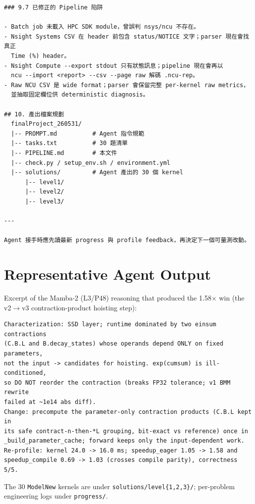 \documentclass[conference]{IEEEtran}
\begin{document}
\begin{lstlisting}
### 9.7 已修正的 Pipeline 陷阱

- Batch job 未載入 HPC SDK module，曾誤判 nsys/ncu 不存在。
- Nsight Systems CSV 在 header 前包含 status/NOTICE 文字；parser 現在會找真正
  Time (%) header。
- Nsight Compute --export stdout 只有狀態訊息；pipeline 現在會再以
  ncu --import <report> --csv --page raw 解碼 .ncu-rep。
- Raw NCU CSV 是 wide format；parser 會保留完整 per-kernel raw metrics，
  並抽取固定欄位供 deterministic diagnosis。

## 10. 產出檔案規劃
  finalProject_260531/
  |-- PROMPT.md          # Agent 指令規範
  |-- tasks.txt          # 30 題清單
  |-- PIPELINE.md        # 本文件
  |-- check.py / setup_env.sh / environment.yml
  |-- solutions/         # Agent 產出的 30 個 kernel
      |-- level1/
      |-- level2/
      |-- level3/

---

Agent 接手時應先讀最新 progress 與 profile feedback，再決定下一個可量測改動。
\end{lstlisting}

\section{Representative Agent Output}
\label{app:output}
Excerpt of the Mamba-2 (L3/P48) reasoning that produced the 1.58$\times$ win
(the v2$\to$v3 contraction-product hoisting step):
\begin{lstlisting}
Characterization: SSD layer; runtime dominated by two einsum contractions
(C.B.L and B.decay_states) whose operands depend ONLY on fixed parameters,
not the input -> candidates for hoisting. exp(cumsum) is ill-conditioned,
so DO NOT reorder the contraction (breaks FP32 tolerance; v1 BMM rewrite
failed at ~1e14 abs diff).
Change: precompute the parameter-only contraction products (C.B.L kept in
its safe contract-n-then-*L grouping, bit-exact vs reference) once in
_build_parameter_cache; forward keeps only the input-dependent work.
Re-profile: kernel 24.0 -> 16.0 ms; speedup_eager 1.05 -> 1.58 and
speedup_compile 0.69 -> 1.03 (crosses compile parity), correctness 5/5.
\end{lstlisting}
The 30 \texttt{ModelNew} kernels are under
\texttt{solutions/level\{1,2,3\}/}; per-problem engineering logs under
\texttt{progress/}.
\end{document}
